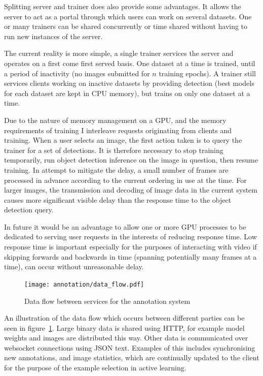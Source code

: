 Splitting server and trainer does also provide some advantages. It allows the server to act as a portal through which users can work on several datasets. One or many trainers can be shared concurrently or time shared without having to run new instances of the server. 

The current reality is more simple, a single trainer services the server and operates on a first come first served basis. One dataset at a time is trained, until a period of inactivity (no images submitted for $ n $ training epochs). A trainer still services clients working on inactive datasets by providing detection (best models for each dataset are kept in \gls{CPU} memory), but trains on only one dataset at a time. 

Due to the nature of memory management on a \gls{GPU}, and the memory requirements of training I interleave requests originating from clients and training. When a user selects an image, the first action taken is to query the trainer for a set of detections. It is therefore necessary to stop training temporarily, run object detection inference on the image in question, then resume training. In attempt to mitigate the delay, a small number of frames are processed in advance according to the current ordering in use at the time. For larger images, the transmission and decoding of image data in the current system causes more significant visible delay than the response time to the object detection query.

In future it would be an advantage to allow one or more \gls{GPU} processes to be dedicated to serving user requests in the interests of reducing response time. Low response time is important especially for the purposes of interacting with video if skipping forwards and backwards in time (spanning potentially many frames at a time), can occur without unreasonable delay.

\begin{figure}[h!]
  \centering
  \texttt{[image: annotation/data\_flow.pdf]}
  \caption{Data flow between services for the annotation system}  
  \label{fig:data_flow}
\end{figure}

An illustration of the data flow which occurs between different parties can be seen in figure~\ref{fig:data_flow}. Large binary data is shared using \gls{HTTP}, for example model weights and images are distributed this way. Other data is communicated over websocket connections using \gls{JSON} text. Examples of this includes synchronising new annotations, and image statistics, which are continually updated to the client for the purpose of the example selection in active learning.

